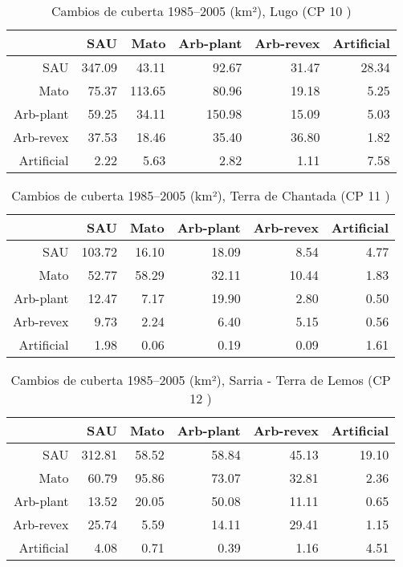 \begin{table}[p]
\centering
\caption{Cambios de cuberta 1985--2005 (km²), Lugo (CP 10 )} 
\label{TaboaContinxCP10}
\begin{tabular}{rrrrrr}
  \hline
 & SAU & Mato & Arb-plant & Arb-revex & Artificial \\ 
  \hline
SAU & 347.09 & 43.11 & 92.67 & 31.47 & 28.34 \\ 
  Mato & 75.37 & 113.65 & 80.96 & 19.18 & 5.25 \\ 
  Arb-plant & 59.25 & 34.11 & 150.98 & 15.09 & 5.03 \\ 
  Arb-revex & 37.53 & 18.46 & 35.40 & 36.80 & 1.82 \\ 
  Artificial & 2.22 & 5.63 & 2.82 & 1.11 & 7.58 \\ 
   \hline
\end{tabular}
\end{table}
\begin{table}[p]
\centering
\caption{Cambios de cuberta 1985--2005 (km²), Terra de Chantada (CP 11 )} 
\label{TaboaContinxCP11}
\begin{tabular}{rrrrrr}
  \hline
 & SAU & Mato & Arb-plant & Arb-revex & Artificial \\ 
  \hline
SAU & 103.72 & 16.10 & 18.09 & 8.54 & 4.77 \\ 
  Mato & 52.77 & 58.29 & 32.11 & 10.44 & 1.83 \\ 
  Arb-plant & 12.47 & 7.17 & 19.90 & 2.80 & 0.50 \\ 
  Arb-revex & 9.73 & 2.24 & 6.40 & 5.15 & 0.56 \\ 
  Artificial & 1.98 & 0.06 & 0.19 & 0.09 & 1.61 \\ 
   \hline
\end{tabular}
\end{table}
\begin{table}[p]
\centering
\caption{Cambios de cuberta 1985--2005 (km²), Sarria - Terra de Lemos (CP 12 )} 
\label{TaboaContinxCP12}
\begin{tabular}{rrrrrr}
  \hline
 & SAU & Mato & Arb-plant & Arb-revex & Artificial \\ 
  \hline
SAU & 312.81 & 58.52 & 58.84 & 45.13 & 19.10 \\ 
  Mato & 60.79 & 95.86 & 73.07 & 32.81 & 2.36 \\ 
  Arb-plant & 13.52 & 20.05 & 50.08 & 11.11 & 0.65 \\ 
  Arb-revex & 25.74 & 5.59 & 14.11 & 29.41 & 1.15 \\ 
  Artificial & 4.08 & 0.71 & 0.39 & 1.16 & 4.51 \\ 
   \hline
\end{tabular}
\end{table}
